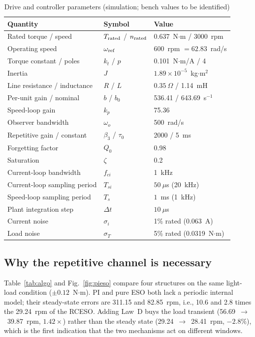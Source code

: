 \documentclass[journal]{IEEEtran}
\theoremstyle{remark}
\begin{document}
\begin{table}[!t]
\centering
\caption{Drive and controller parameters (simulation; bench values to be identified)}
\label{tab:param}
\footnotesize
\setlength{\tabcolsep}{3pt}
\begin{tabular}{@{}lll@{}}
\toprule
Quantity & Symbol & Value\\
\midrule
Rated torque / speed & $T_{\rm rated}$ / $n_{\rm rated}$ & 0.637~N$\cdot$m / 3000~rpm\\
Operating speed & $\omega_{\rm ref}$ & 600~rpm $=62.83$~rad/s\\
Torque constant / poles & $k_t$ / $p$ & 0.101~N$\cdot$m/A / 4\\
Inertia & $J$ & $1.89\times10^{-5}$~kg$\cdot$m$^2$\\
Line resistance / inductance & $R$ / $L$ & $0.35~\Omega$ / 1.14~mH\\
Per-unit gain / nominal & $b$ / $b_0$ & 536.41 / 643.69~s$^{-1}$\\
Speed-loop gain & $k_p$ & 75.36\\
Observer bandwidth & $\omega_o$ & 500~rad/s\\
Repetitive gain / constant & $\beta_3$ / $\tau_0$ & 2000 / 5~ms\\
Forgetting factor & $Q_0$ & 0.98\\
Saturation & $\zeta$ & 0.2\\
Current-loop bandwidth & $f_{ci}$ & 1~kHz\\
Current-loop sampling period & $T_{si}$ & $50~\mu$s (20~kHz)\\
Speed-loop sampling period & $T_s$ & $1$~ms (1~kHz)\\
Plant integration step & $\Delta t$ & $10~\mu$s\\
Current noise & $\sigma_i$ & 1\% rated (0.063~A)\\
Load noise & $\sigma_T$ & 5\% rated (0.0319~N$\cdot$m)\\
\bottomrule
\end{tabular}
\end{table}

\subsection{Why the repetitive channel is necessary}
Table~\ref{tab:algo} and Fig.~\ref{fig:pieso} compare four structures on the same
light-load condition ($\pm0.12$~N$\cdot$m). PI and pure ESO both lack a periodic
internal model; their steady-state errors are 311.15 and 82.85~rpm, i.e., 10.6 and 2.8
times the 29.24~rpm of the RCESO. Adding Law~D buys the load transient
(56.69~$\to$~39.87~rpm, $1.42\times$) rather than the steady state
(29.24~$\to$~28.41~rpm, $-2.8\%$), which is the first indication that the two
mechanisms act on different windows.
\end{document}
